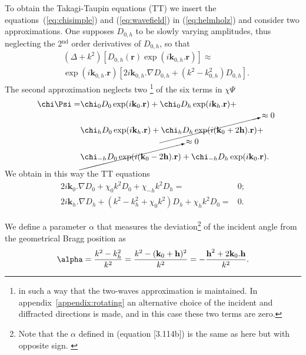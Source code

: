 \documentclass{iucr}
\newcommand{\cyan}[1]{{\color{cyan(process)}#1}}
\begin{document}
To obtain the Takagi-Taupin equations (TT) we insert the equations~(\ref{eq:chisimple}) and (\ref{eq:wavefield}) in (\ref{eq:helmholz}) and consider two approximations. One supposes $D_{0,h}$ to be slowly varying amplitudes, thus neglecting the 2$^{\text{nd}}$ order derivatives of $D_{0,h}$,  so that
\begin{subequations}
\label{eq:approxslowlyvarying}
\begin{align}
&(\Delta + k^2)[D_{0,h}(\textbf{r}) \exp(i\textbf{k}_{0,h} . \textbf{r})] \approx \nonumber  \\
&\exp(i\textbf{k}_{0,h} . \textbf{r}) [2 i \textbf{k}_{0,h} . \nabla D_{0,h} + (k^2 - k^2_{0,h}) D_{0,h}].
\end{align}
\end{subequations}
The second approximation neglects two
\footnote{\cyan{
in such a way that the two-waves approximation is maintained. In appendix~\ref{appendix:rotating} an alternative choice of the incident and diffracted directions is made, and in this case these two terms are zero.
}}
of the six terms in $\chi \Psi$
\begin{subequations}
\label{eq:approxchiPsi}
\begin{align}
\chi\Psi =&
\chi_0 D_0 \exp(i \textbf{k}_0 . \textbf{r}) +
\chi_0 D_h \exp(i \textbf{k}_h . \textbf{r}) +\\
&\chi_h D_0 \exp(i \textbf{k}_h . \textbf{r}) +
\cancelto{\approx 0}{\chi_h D_h \exp(i (\textbf{k}_0+2\textbf{h}) . \textbf{r})} +\\
&\cancelto{\approx 0}{\chi_{-h} D_0 \exp(i (\textbf{k}_0 - 2 \textbf{h}) .\textbf{r})} +
\chi_{-h} D_h \exp(i \textbf{k}_0 . \textbf{r}) .
\end{align}
\end{subequations}
We obtain in this way the TT equations 
\begin{subequations}
\label{eq:TTvector}
\begin{align}
2 i \textbf{k}_0 . \nabla D_0 + \chi_0 k^2 D_0 + \chi_{-h} k^2 D_h =& 0; \\
2 i \textbf{k}_h . \nabla D_h + (k^2 - k_h^2 + \chi_0 k^2) D_h + \chi_{h} k^2 D_0 =& 0.
\end{align}
\end{subequations}

We define a parameter $\alpha$ that measures the deviation\footnote{
\cyan{Note that the $\alpha$ defined in \cite{ZachariasenBook} (equation [3.114b]) is the same as here but with opposite sign.  }
}
of the incident angle from the geometrical Bragg position as
\begin{equation}
\label{eq:alpha}
\alpha = \frac{k^2-k_h^2}{k^2} = \frac{k^2-(\textbf k_0 + \textbf h)^2}{k^2} = - \frac{\textbf h^2 + 2 \textbf k_0 . \textbf h}{k^2}.
\end{equation}
\end{document}

